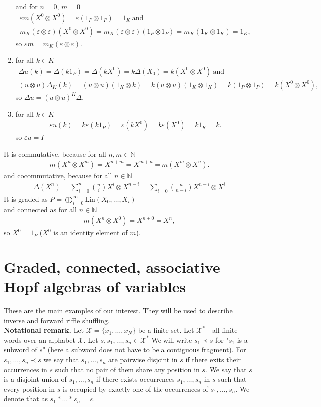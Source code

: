 \documentclass[a4paper, 12pt]{article}
\begin{document}
\begin{enumerate}
and for $n = 0$, $m = 0$
\begin{gather*}
    \varepsilon m(X^0 \otimes X^0) = \varepsilon (1_P \otimes 1_P) = 1_K \mathrm{\ and}\\
    m_K(\varepsilon \otimes \varepsilon)(X^0 \otimes X^0) =
    m_K(\varepsilon \otimes \varepsilon)(1_P \otimes 1_P) = m_K(1_K \otimes 1_K) = 1_K,
\end{gather*}
so $\varepsilon m = m_K(\varepsilon \otimes \varepsilon)$.
\item for all $k \in K$
\begin{gather*}
    \Delta u(k) = \Delta(k1_P) =
    \Delta(kX^0) = k\Delta(X_0) = k(X^0 \otimes X^0) \mathrm{\ and} \\
    (u\otimes u)\Delta_K(k) = (u\otimes u) (1_K \otimes k) = k(u \otimes u)(1_K \otimes 1_K) =
    k(1_P \otimes 1_P) = k(X^0 \otimes X^0),
\end{gather*}
so $\Delta u = (u \otimes u)^K\Delta$.
\item for all $k \in K$
\begin{gather*}
    \varepsilon u(k) = k\varepsilon (k1_P) = \varepsilon (kX^0) = k\varepsilon (X^0) = k1_K = k.
\end{gather*}
so $\varepsilon u = I$
\end{enumerate}
It is commutative, because for all $n, m \in \mathbb{N}$
\begin{gather*}
    m(X^n \otimes X^m) = X^{n+m} = X^{m+n} = m(X^m \otimes X^n).
\end{gather*}
and cocommutative, because for all $n \in \mathbb{N}$
\begin{gather*}
    \Delta(X^n) = \sum_{i=0}^n \binom{n}{i} X^i \otimes X^{n - i} = \sum_{i=0} \binom{n}{n-i}X^{n-i} \otimes X^i
\end{gather*}
It is graded as $P = \bigoplus_{i=0}^\infty \mathrm{Lin}(X_0, \dots, X_i)$ \\
and connected as for all $n \in \mathbb{N}$
\begin{gather*}
    m(X^n \otimes X^0) = X^{n+0} = X^n,
\end{gather*}
so $X^0 =1_P$ ($X^0$ is an identity element of $m$).
\section{Graded, connected, associative Hopf algebras of variables}\label{gcha}
These are the main examples of our interest. They will be used to describe inverse and forward riffle
shuffling.\\[4pt]
\textbf{Notational remark.} Let  $\mathcal{X} = \{x_1, \dots, x_N\}$ be a finite set.
Let $\mathcal{X}^*$ - all finite words over an alphabet $\mathcal{X}$.
Let $s, s_1,\dots, s_n \in \mathcal{X}^*$ We will write $s_1 \prec s$ for "$s_1$ is a subword of $s$"
(here a subword does not have to be a contiguous fragment). For $s_1, \dots, s_n \prec s$
we say that $s_1, \dots, s_n$ are pairwise disjoint in $s$ if there exits their occurrences in $s$ such
that no pair of them share any position in $s$. We say that $s$ is a disjoint union of $s_1, \dots, s_n$
if there exists occurrences $s_1, \dots, s_n$ in $s$ such that every position in $s$ is occupied by
exactly one of the occurrences of $s_1, \dots, s_n$. We denote that as $s_1*\dots *s_n=s$.
\end{document}
